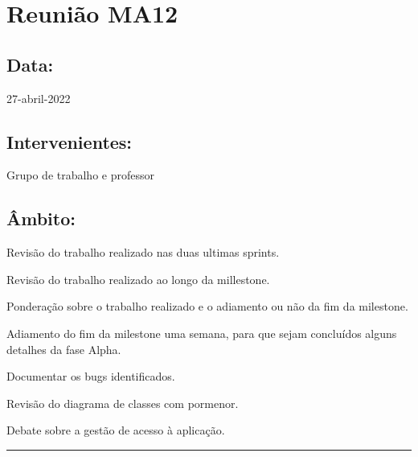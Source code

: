 \section{Reunião MA12}\label{reuniaoMA12}

\subsection*{Data:}
27-abril-2022

\subsection*{Intervenientes:}
Grupo de trabalho e professor

\subsection*{Âmbito:}
Revisão do trabalho realizado nas duas ultimas sprints. 

Revisão do trabalho realizado ao longo da millestone.

Ponderação sobre o trabalho realizado e o adiamento ou não da fim da milestone.

Adiamento do fim da milestone uma semana, para que sejam concluídos alguns detalhes da fase Alpha.

Documentar os bugs identificados.

Revisão do diagrama de classes com pormenor.

Debate sobre a gestão de acesso à aplicação.

\noindent \rule{\linewidth}{0.4pt}
\newline